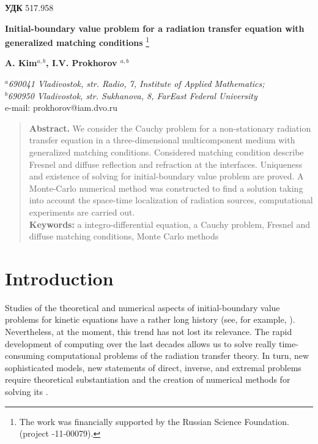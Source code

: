 \documentclass[12pt,reqno]{report}
\begin{document}
	
	
	
	{\bf УДК} 517.958 \vskip0.2cm
	
	
	\begin{center}
		{\bf \large Initial-boundary value
		problem for a radiation transfer equation
		with generalized matching conditions }
		\footnote[1]{The work was financially supported by the Russian Science Foundation. (project -11-00079).}
	\end{center}
	\begin{center}
		{\bf A. Kim$^{a,b}$, I.V. Prokhorov $^{a,b}$ }
	\end{center}
	\begin{center}
		{\it ${}^a$690041 Vladivostok, str. Radio, 7, Institute of Applied Mathematics; \\ ${}^b$690950 Vladivostok, str. Sukhanova, 8,
			FarEast Federal University}\\
		e-mail: prokhorov@iam.dvo.ru
	\end{center}
	\begin{quote}
		{\bf Abstract.} 
		We consider the Cauchy problem for a non-stationary radiation 
		transfer equation in a three-dimensional multicomponent medium 
		with generalized matching conditions. Considered matching condition 
		describe Fresnel and diffuse reflection and refraction at the interfaces. 
		Uniqueness and existence of solving for initial-boundary value problem are proved. 
		A Monte-Carlo numerical method was constructed to find a solution taking 
		into account the space-time localization of radiation sources, 
		computational experiments are carried out.\\
		{\bf Keywords:} 
		a integro-differential equation, a Cauchy problem,
		Fresnel and diffuse matching conditions,
		Monte Carlo methods
	\end{quote}
	
	\section{Introduction}
	
	\setcounter{equation}{0}
	\setcounter{definition}{0}\setcounter{lemma}{0}\setcounter{theorem}{0}
	\setcounter{corollary}{0}\setcounter{remark}{0}

 	
Studies of the theoretical and numerical aspects of initial-boundary value problems for kinetic equations have a rather long history (see, for example, \cite{1,2,3,4,5}). Nevertheless, at the moment, this trend has not lost its relevance. The rapid development of computing over the last decades allows us to solve really time-consuming computational problems of the radiation transfer theory. In turn, new sophisticated models, new statements of direct, inverse, and extremal problems require theoretical substantiation and the creation of numerical methods for solving its \cite{6,7,8,9,10,11,12,13,14,15,16,17,18}.
\end{document}
